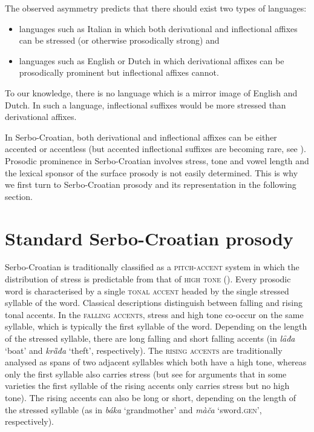 \documentclass[output=paper]{langsci/langscibook}
\begin{document}
The observed asymmetry predicts that there should exist two types of languages: 
\begin{itemize}
  \item languages such as Italian in which both derivational and inflectional affixes can be stressed (or otherwise prosodically strong) and
\item languages such as English or Dutch in which derivational affixes can be prosodically prominent but inflectional affixes cannot.\end{itemize}
To our knowledge, there is no language which is a mirror image of English and Dutch. In such a language, inflectional suffixes would be more stressed than derivational affixes. 

In Serbo-Croatian, both derivational and inflectional affixes can be either accented or accentless (but accented inflectional suffixes are becoming rare, see \citealt{SimKa2018}). Prosodic prominence in Serbo-Croatian involves stress, tone and vowel length and the lexical sponsor of the surface prosody is not easily determined. This is why we first turn to Serbo-Croatian prosody and its representation in the following section.  

\section{Standard Serbo-Croatian prosody
} \label{sec:simonovic:3}

Serbo-Croatian is traditionally classified as a \textsc{pitch-accent} system in which the distribution of stress is predictable from that of \textsc{high tone} (\citealt{Zec1988, Zec1999}). Every prosodic word is characterised by a single \textsc{tonal accent} headed by the single stressed syllable of the word. Classical descriptions distinguish between falling and rising tonal accents. In the \textsc{falling accents}, stress and high tone co-occur on the same syllable, which is typically the first syllable of the word. Depending on the length of the stressed syllable, there are long falling and short falling accents (in \textit{lȃđa} `boat' and \textit{krȁđa} `theft', respectively). The \textsc{rising accents} are traditionally analysed as spans of two adjacent syllables which both have a high tone, whereas only the first syllable also carries stress (but see \citealt{Zsiga-Zec2013} for arguments that in some varieties the first syllable of the rising accents only carries stress but no high tone). The rising accents can also be long or short, depending on the length of the stressed syllable (as in \textit{báka} `grandmother' and \textit{màča} `sword.\textsc{gen}', respectively). 
\end{document}

